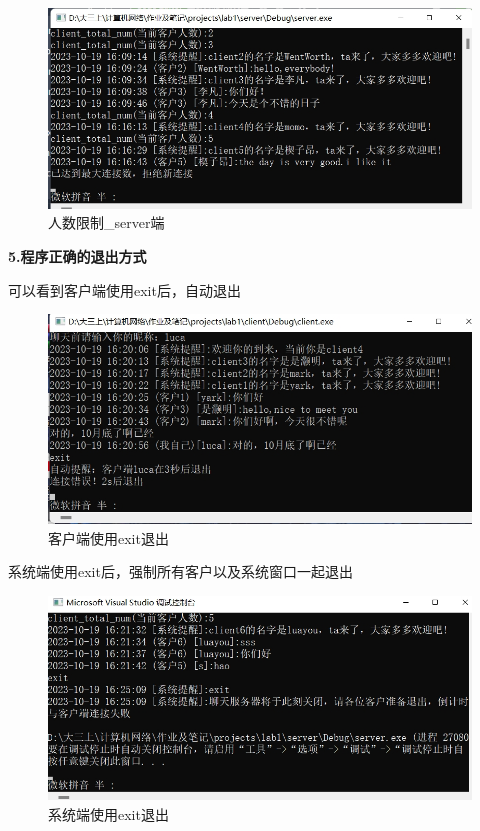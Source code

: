 \documentclass[12pt]{article}
\begin{document}
\begin{figure}[H]
        \centering
        \includegraphics[scale=0.45]{fig/19.png}
        \caption{人数限制\_server端}
       \label{fig:21}
\end{figure}

\textbf{5.程序正确的退出方式}

可以看到客户端使用exit后，自动退出
\begin{figure}[H]
        \centering
        \includegraphics[scale=0.45]{fig/22.png}
        \caption{客户端使用exit退出}
       \label{fig:29}
\end{figure}

系统端使用exit后，强制所有客户以及系统窗口一起退出
\begin{figure}[H]
        \centering
        \includegraphics[scale=0.45]{fig/24.png}
        \caption{系统端使用exit退出}
       \label{fig:91}
\end{figure}
\end{document}
